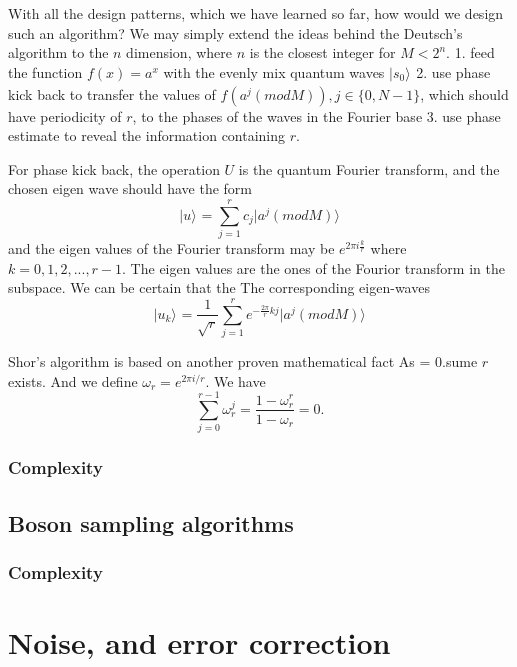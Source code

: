 \documentclass{book}
\newcommand{\keta}[2][]{\vert {#2} \rangle_{#1}}
\begin{document}
With all the design patterns, which we have learned so far, how would we design such an algorithm? We may simply extend the ideas behind the Deutsch's algorithm to the $n$ dimension, where $n$ is the closest integer for $M < 2^n$.
1. feed the function $f(x) = a^x$ with the evenly mix quantum waves $\keta{s_0}$
2. use phase kick back to transfer the values of $f(a^j (mod M)), j\in \{0,N-1\}$, which should have periodicity of $r$, to the phases of the waves in the Fourier base
3. use phase estimate to reveal the information containing $r$.

For phase kick back, the operation $U$ is the quantum Fourier transform, and the chosen eigen wave should have the form
\begin{equation}\label{keta_u}
    \keta{u} = \sum^r_{j=1} c_j \keta{a^j (mod M)}
\end{equation}
and the eigen values of the Fourier transform may be $e^{2\pi i \frac k r}$ where $k=0, 1, 2, ..., r-1$. The eigen values are the ones of the Fourior transform in the subspace. We can be certain that the The corresponding eigen-waves 
\begin{equation}\label{keta_u}
    \keta{u_k} = \frac 1 {\sqrt{r}} \sum^r_{j=1} e^{-{\frac {2\pi} r} kj} \keta{a^j (mod M)}
\end{equation}


Shor's algorithm is based on another proven mathematical fact As = 0.sume $r$ exists. And we define $\omega_r = e^{2\pi i/r}$. We have
\begin{equation}
    \sum^{r-1}_{j=0} \omega^j_r = \frac {1-\omega^r_r} {1-\omega_r} = 0.
\end{equation}

\subsection{Complexity}

\section{Boson sampling algorithms}

\subsection{Complexity}

\chapter{Noise, and error correction}
\end{document}
